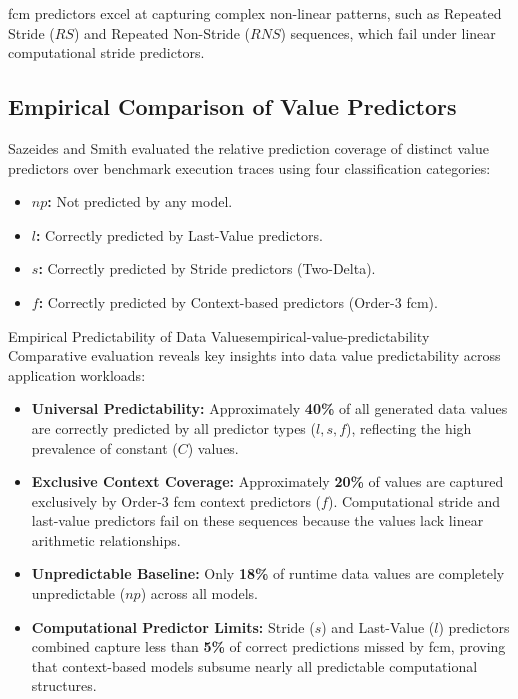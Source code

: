 \gls{fcm} predictors excel at capturing complex non-linear patterns, such as Repeated Stride ($RS$) and Repeated Non-Stride ($RNS$) sequences, which fail under linear computational stride predictors.

\subsection{Empirical Comparison of Value Predictors}
\label{subsec:empirical_predictor_comparison}

Sazeides and Smith evaluated the relative prediction coverage of distinct value predictors over benchmark execution traces using four classification categories:
\begin{itemize}
    \item \textbf{$np$:} Not predicted by any model.
    \item \textbf{$l$:} Correctly predicted by Last-Value predictors.
    \item \textbf{$s$:} Correctly predicted by Stride predictors (Two-Delta).
    \item \textbf{$f$:} Correctly predicted by Context-based predictors (Order-3 \gls{fcm}).
\end{itemize}

\begin{observation}{Empirical Predictability of Data Values}{empirical-value-predictability}
Comparative evaluation reveals key insights into data value predictability across application workloads:
\begin{itemize}
    \item \textbf{Universal Predictability:} Approximately \textbf{40\%} of all generated data values are correctly predicted by all predictor types ($l, s, f$), reflecting the high prevalence of constant ($C$) values.
    \item \textbf{Exclusive Context Coverage:} Approximately \textbf{20\%} of values are captured exclusively by Order-3 \gls{fcm} context predictors ($f$). Computational stride and last-value predictors fail on these sequences because the values lack linear arithmetic relationships.
    \item \textbf{Unpredictable Baseline:} Only \textbf{18\%} of runtime data values are completely unpredictable ($np$) across all models.
    \item \textbf{Computational Predictor Limits:} Stride ($s$) and Last-Value ($l$) predictors combined capture less than \textbf{5\%} of correct predictions missed by \gls{fcm}, proving that context-based models subsume nearly all predictable computational structures.
\end{itemize}
\end{observation}

